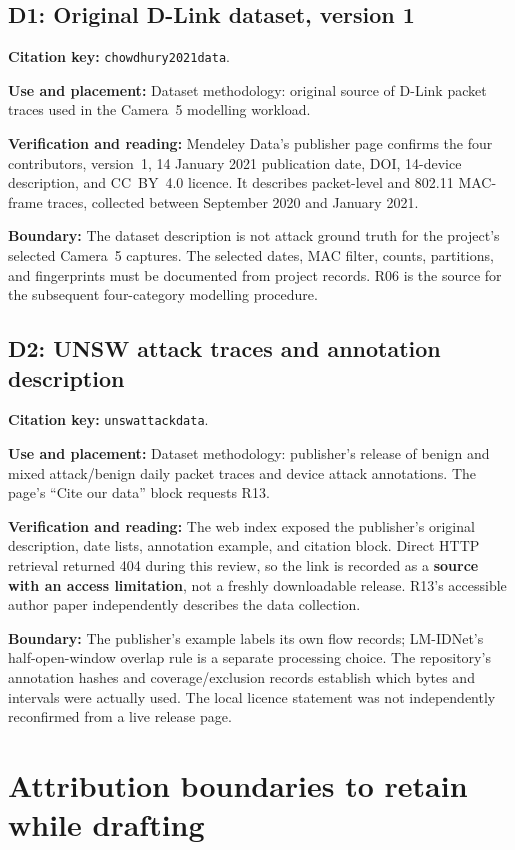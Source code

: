 \documentclass[11pt,a4paper]{article}
\newcommand{\referenceentry}[3]{%
  \subsection{#1: #2}\label{ref:#3}%
  \fullcite{#3}\par
  \textbf{Citation key:} \texttt{#3}.\par}
\newcommand{\field}[2]{\textbf{#1:} #2\par}
\begin{document}
\referenceentry{D1}{Original D-Link dataset, version 1}{chowdhury2021data}
\field{Use and placement}{Dataset methodology: original source of D-Link
packet traces used in the Camera~5 modelling workload.}
\field{Verification and reading}{Mendeley Data's publisher page confirms
the four contributors, version~1, 14 January 2021 publication date, DOI,
14-device description, and CC~BY~4.0 licence. It describes packet-level and
802.11 MAC-frame traces, collected between September 2020 and January 2021.}
\field{Boundary}{The dataset description is not attack ground truth for the
project's selected Camera~5 captures. The selected dates, MAC filter,
counts, partitions, and fingerprints must be documented from project records.
R06 is the source for the subsequent four-category modelling procedure.}

\referenceentry{D2}{UNSW attack traces and annotation description}{unswattackdata}
\field{Use and placement}{Dataset methodology: publisher's release of benign
and mixed attack/benign daily packet traces and device attack annotations.
The page's ``Cite our data'' block requests R13.}
\field{Verification and reading}{The web index exposed the publisher's original
description, date lists, annotation example, and citation block. Direct HTTP
retrieval returned 404 during this review, so the link is recorded as a
\textbf{source with an access limitation}, not a freshly downloadable release.
R13's accessible author paper independently describes the data collection.}
\field{Boundary}{The publisher's example labels its own flow records;
LM-IDNet's half-open-window overlap rule is a separate processing choice.
The repository's annotation hashes and coverage/exclusion records establish
which bytes and intervals were actually used. The local licence statement
was not independently reconfirmed from a live release page.}

\section{Attribution boundaries to retain while drafting}
\end{document}
